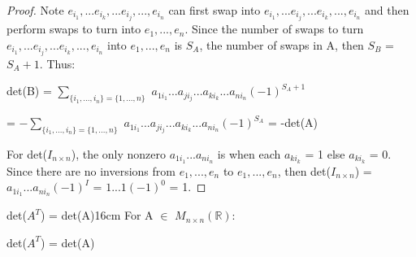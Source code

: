 \begin{proof}
        Note $e_{i_1},...e_{i_k},...e_{i_j},...,e_{i_n}$
        can first swap into $e_{i_1},...e_{i_j},...e_{i_k},...,e_{i_n}$
        and then perform swaps to turn into $e_1,...,e_n$.
        Since the number of swaps to turn
        $e_{i_1},...e_{i_j},...e_{i_k},...,e_{i_n}$ into $e_1,...,e_n$
        is $S_A$, the number of swaps in A, then $S_B$ = $S_A + 1$. Thus:

        \hspace{0.5cm}
        det(B)
        = $\sum_{\{i_1,...,i_n\} = \{1,...,n\}}$
            $a_{1i_1}...a_{ji_j}...a_{ki_k}...a_{ni_n}(-1)^{S_A+1}$

        \hspace{1.85cm}
        = $-\sum_{\{i_1,...,i_n\} = \{1,...,n\}}$
            $a_{1i_1}...a_{ji_j}...a_{ki_k}...a_{ni_n}(-1)^{S_A}$
        = -det(A)

        \vspace{0.3cm}

        For det($I_{n \times n}$),
        the only nonzero $a_{1i_1}...a_{ni_n}$
        is when each $a_{ki_k}$ = 1 else $a_{ki_k}$ = 0.
        Since there are no inversions from $e_1,...,e_n$ to $e_1,...,e_n$,
        then det($I_{n \times n}$) = $a_{1i_1}...a_{ni_n}(-1)^I$
        = $1...1(-1)^0$ = 1.
    \end{proof}

    \vspace{0.5cm}



    \begin{wtheorem}{det($A^T$) = det(A)}{16cm}
        For A $\in$ $M_{n \times n}(\mathbb{R})$:

        \hspace{0.5cm}
        det($A^T$) = det(A)
    \end{wtheorem}

